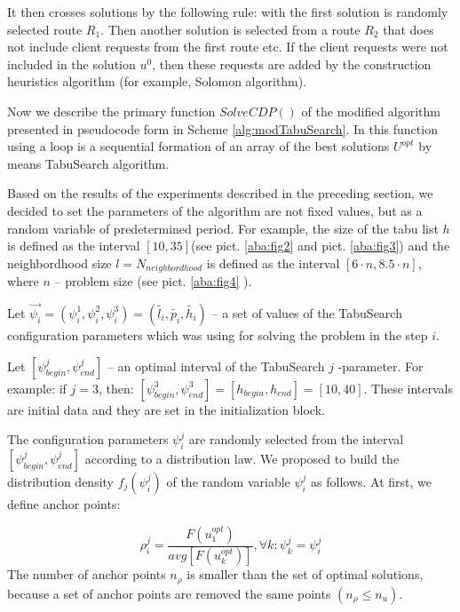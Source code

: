 \documentclass[]{TAACpaper}
\begin{document}
It then crosses solutions by the following rule: with the first solution is randomly selected route $R_1$. Then another solution is selected from a route $R_2$ that does not include client requests from the first  route etc. If the client requests were not included in the solution $u^0$, then these requests are added by the construction heuristics algorithm (for example, Solomon algorithm).


Now we describe the primary function $SolveCDP()$ of the modified algorithm presented in pseudocode form in Scheme \ref{alg:modTabuSearch}. In this function using a loop is a sequential formation of an array of the best solutions $U^{opt}$ by means TabuSearch algorithm.   

Based on the results of the experiments described in the preceding section, we decided to set the parameters of the algorithm are not fixed values, but as a random variable of predetermined period. For example, the size of the tabu list $h$ is defined as the interval $[10,35]$(see pict. \ref{aba:fig2} and  pict. \ref{aba:fig3}) and the neighbordhood size $l=N_{neighbordhood}$ is defined as the interval $[6\cdot n,8.5\cdot n]$, where $n$ -- problem size (see pict. \ref{aba:fig4} ).

Let $\vec{\psi_i} = (\psi^1_i,\psi^2_i,\psi^3_i) = (\tilde{l_i},\tilde{p_i},\tilde{h_i})$ -- a set of values of the TabuSearch configuration parameters which was using for solving the problem in the step $i$.

Let $[\psi^j_{begin}, \psi^j_{end}]$ -- an optimal interval of the TabuSearch $j$ -parameter. For example: if $j=3$, then: $[\psi^3_{begin}, \psi^3_{end}]= [h_{begin}, h_{end}] = [10, 40] $. These intervals are initial data and they are set in the initialization block. 

The configuration parameters  $\psi^j_i $ are randomly selected from the interval $[\psi^j_{begin}, \psi^j_{end}]$ according to a distribution law. We proposed to build the distribution density $f_j(\psi^j_i)$ of the random variable $\psi^j_i$ as follows. At first, we define anchor points:
 
 \begin{equation} \label{anchor_points}
     \rho^j_i =  \dfrac{F(u^{opt}_1)}{avg[F(u^{opt}_k)]}, \forall k: \psi^j_k = \psi^j_i
 \end{equation}
 The number of anchor points $n_{\rho}$  is smaller than the set of optimal solutions, because a set of  anchor points are removed the same points $(n_{\rho} \leq  n_u)$.
 
\end{document}
